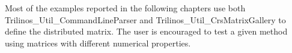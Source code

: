 \begin{remark}
  Most of the examples reported in the following chapters use both
  Trilinos\_Util\_CommandLineParser and Trilinos\_Util\_CrsMatrixGallery
  to define the distributed matrix. The user is encouraged to test a
  given method using matrices with different numerical properties.
\end{remark}

